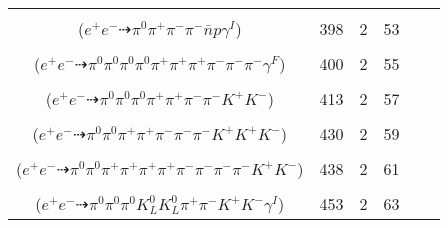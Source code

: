 \documentclass[landscape]{article}
\newcounter{rownumbers}
\newcommand\rn{\stepcounter{rownumbers}\arabic{rownumbers}}
\newcommand{\EOL}{\\} %
\newcommand{\topoTags}[1]{#1} %
\begin{document}
\begin{longtable}{clcccc}
\rn & \makecell[l]{ $ 
e^{+} e^{-} \rightarrow \pi^{0} \pi^{+} \pi^{-} \pi^{-} \bar{n} p \gamma^{I} 
$ \\ ($
e^{+} e^{-} \dashrightarrow \pi^{0} \pi^{+} \pi^{-} \pi^{-} \bar{n} p \gamma^{I} 
$) } & \topoTags{398 & }2 & 53 \EOL

\rn & \makecell[l]{ $ 
e^{+} e^{-} \rightarrow \pi^{0} \pi^{0} \pi^{+} \pi^{-} \pi^{-} \rho^{+} \omega ,
\rho^{+} \rightarrow \pi^{0} \pi^{+} ,
\omega \rightarrow \pi^{0} \pi^{+} \pi^{-} \gamma^{F} 
$ \\ ($
e^{+} e^{-} \dashrightarrow \pi^{0} \pi^{0} \pi^{0} \pi^{0} \pi^{+} \pi^{+} \pi^{+} \pi^{-} \pi^{-} \pi^{-} \gamma^{F} 
$) } & \topoTags{400 & }2 & 55 \EOL

\rn & \makecell[l]{ $ 
e^{+} e^{-} \rightarrow \pi^{0} \pi^{0} \pi^{0} \pi^{+} \pi^{+} \pi^{-} K^{*} K^{-} ,
K^{*} \rightarrow \pi^{-} K^{+} 
$ \\ ($
e^{+} e^{-} \dashrightarrow \pi^{0} \pi^{0} \pi^{0} \pi^{+} \pi^{+} \pi^{-} \pi^{-} K^{+} K^{-} 
$) } & \topoTags{413 & }2 & 57 \EOL

\rn & \makecell[l]{ $ 
e^{+} e^{-} \rightarrow \pi^{-} \rho^{+} \rho^{-} \bar{K}^{0} K^{+} K^{+} K^{-} ,
\rho^{+} \rightarrow \pi^{0} \pi^{+} ,
\rho^{-} \rightarrow \pi^{0} \pi^{-} ,
\bar{K}^{0} \rightarrow K_{S}^{0} ,
K_{S}^{0} \rightarrow \pi^{+} \pi^{-} 
$ \\ ($
e^{+} e^{-} \dashrightarrow \pi^{0} \pi^{0} \pi^{+} \pi^{+} \pi^{-} \pi^{-} \pi^{-} K^{+} K^{+} K^{-} 
$) } & \topoTags{430 & }2 & 59 \EOL

\rn & \makecell[l]{ $ 
e^{+} e^{-} \rightarrow \pi^{+} \pi^{+} \pi^{+} \pi^{-} \rho^{-} \omega K^{*} K^{-} ,
\rho^{-} \rightarrow \pi^{0} \pi^{-} ,
\omega \rightarrow \pi^{0} \pi^{+} \pi^{-} ,
K^{*} \rightarrow \pi^{-} K^{+} 
$ \\ ($
e^{+} e^{-} \dashrightarrow \pi^{0} \pi^{0} \pi^{+} \pi^{+} \pi^{+} \pi^{+} \pi^{-} \pi^{-} \pi^{-} \pi^{-} K^{+} K^{-} 
$) } & \topoTags{438 & }2 & 61 \EOL

\rn & \makecell[l]{ $ 
e^{+} e^{-} \rightarrow \pi^{0} \pi^{0} \pi^{0} \pi^{-} \bar{K}^{0} K^{+} K^{-} K^{*+} \gamma^{I} ,
\bar{K}^{0} \rightarrow K_{L}^{0} ,
K^{*+} \rightarrow \pi^{+} K^{0} ,
K^{0} \rightarrow K_{L}^{0} 
$ \\ ($
e^{+} e^{-} \dashrightarrow \pi^{0} \pi^{0} \pi^{0} K_{L}^{0} K_{L}^{0} \pi^{+} \pi^{-} K^{+} K^{-} \gamma^{I} 
$) } & \topoTags{453 & }2 & 63 \EOL


\end{longtable}
\end{document}
